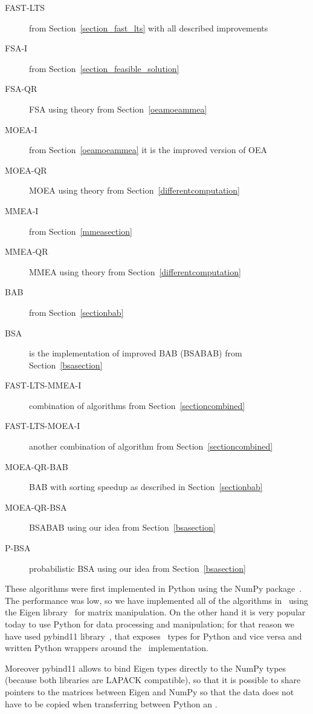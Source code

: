 \begin{description}
    \item[FAST-LTS] from Section~\ref{section_fast_lts} with all described improvements
    \item[FSA-I] from Section~\ref{section_feasible_solution}
    \item[FSA-QR] FSA using theory from Section~\ref{oeamoeammea}
    \item[MOEA-I] from Section~\ref{oeamoeammea} it is the improved version of OEA
    \item[MOEA-QR] MOEA using theory from Section~\ref{differentcomputation}
    \item[MMEA-I] from Section~\ref{mmeasection}
    \item[MMEA-QR] MMEA using theory from Section~\ref{differentcomputation}
    \item[BAB] from Section~\ref{sectionbab}
    \item[BSA] is the implementation of improved BAB (BSABAB) from Section~\ref{bsasection}
    \item[FAST-LTS-MMEA-I] combination of algorithms from Section~\ref{sectioncombined}
    \item[FAST-LTS-MOEA-I] another combination of algorithm from Section~\ref{sectioncombined}
    \item[MOEA-QR-BAB] BAB with sorting speedup as described in Section~\ref{sectionbab}
    \item[MOEA-QR-BSA] BSABAB using our idea from Section~\ref{bsasection}
    \item[P-BSA] probabilistic BSA using our idea from Section~\ref{bsasection}
\end{description}

These algorithms were first implemented in Python using the NumPy package~\cite{numpy}. The performance was low, so we have implemented all of the algorithms in \CC \ using the Eigen library~\cite{eigenweb} for matrix manipulation. On the other hand it is very popular today to use Python for data processing and manipulation; for that reason we have used pybind11 library~\cite{pybind11}, that exposes \CC \ types for Python and vice versa and written Python wrappers around the \CC \ implementation. 

Moreover pybind11 allows to bind Eigen types directly to the NumPy types (because both libraries are LAPACK compatible), so that it is possible to share pointers to the matrices between Eigen and NumPy so that the data does not have to be copied when transferring between Python an \CC.

